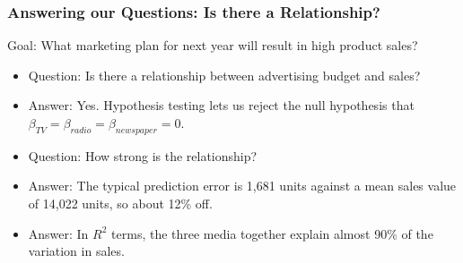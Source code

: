 \begin{frame}[fragile]\frametitle{Answering our Questions: Is there a Relationship?}
 Goal: What marketing plan for next year will result in high product sales?
\begin{itemize}
\item Question: Is there a relationship between advertising budget and sales?
\item Answer: Yes. Hypothesis testing lets us reject the null hypothesis that $\beta_{TV} = \beta_{radio} = \beta_{newspaper} = 0$.
\item Question: How strong is the relationship?
\item Answer: The typical prediction error is 1,681 units against a mean sales value of 14,022 units, so about 12\% off.
\item Answer: In $R^2$ terms, the three media together explain almost 90\% of the variation in sales.
\end{itemize}
\end{frame}

